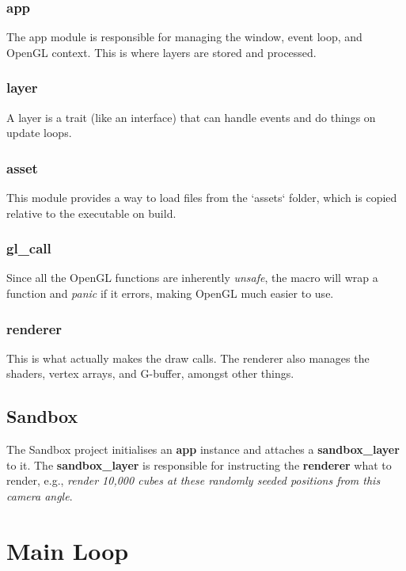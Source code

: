 \begin{multicols}{2}
  \subsubsection{app}
  The app module is responsible for managing the window, event loop, and OpenGL context.
  This is where layers are stored and processed.

  \subsubsection{layer}
  A layer is a trait (like an interface) that can handle events and do things on update loops.

  \subsubsection{asset}
  This module provides a way to load files from the `assets` folder, which is copied relative to the executable on build.

  \subsubsection{gl\_call}
  Since all the OpenGL functions are inherently \emph{unsafe}, the  macro will wrap a function and \emph{panic} if it errors, making OpenGL much easier to use.

  \subsubsection{renderer}
  This is what actually makes the draw calls.
  The renderer also manages the shaders, vertex arrays, and G-buffer, amongst other things.

  \subsection{Sandbox}
  The Sandbox project initialises an \textbf{app} instance and attaches a \textbf{sandbox\_layer} to it.
  The \textbf{sandbox\_layer} is responsible for instructing the \textbf{renderer} what to render, e.g., \emph{render 10,000 cubes at these randomly seeded positions from this camera angle}.

\end{multicols}

\section{Main Loop}

